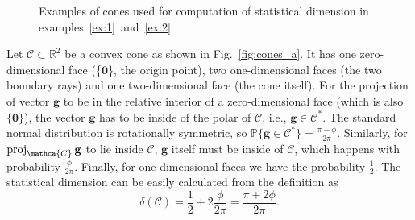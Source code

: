\begin{figure}[t!]
\begin{subfigure}{0.48\linewidth}
        \caption{}
    \end{subfigure}
    \caption{\centering Examples of cones used for computation of statistical dimension in examples~\ref{ex:1}~and~\ref{ex:2}}
    \label{fig:cones}
\end{figure}

\begin{example}\label{ex:1}
    Let $\mathcal{C} \subset \mathbb{R}^2 $ be a convex cone as shown in Fig.~\ref{fig:cones_a}.
    It has one zero-dimensional face (\{$\mathbf{0}$\}, the origin point), two one-dimensional faces (the two boundary rays)
    and one two-dimensional face (the cone itself).
    For the projection of vector $\mathbf{g}$ to be in the relative interior of a zero-dimensional face (which is also $\{\mathbf{0}\}$),
    the vector $\mathbf{g}$ has to be inside of the polar of $\mathcal{C}$, i.e., $\mathbf{g} \in \mathcal{C}^*$.
    The standard normal distribution is rotationally symmetric, so $\mathbb{P}\{ \mathbf{g} \in \mathcal{C}^*\} = \frac{\pi - \phi}{2\pi} $.
    Similarly, for $\op{proj}_{\mathca{C}} \mathbf{g}$ to lie inside $\mathcal{C}$, $\mathbf{g}$ itself must be inside of $\mathcal{C}$,
    which happens with probability $\frac{\phi}{2\pi}$.
    Finally, for one-dimensional faces we have the probability $\frac{1}{2}$.
    The statistical dimension can be easily calculated from the definition as
    \[ \delta (\mathcal{C}) = \frac{1}{2} + 2\frac{\phi}{2\pi} = \frac{\pi + 2\phi}{2\pi}.\]
\end{example}

